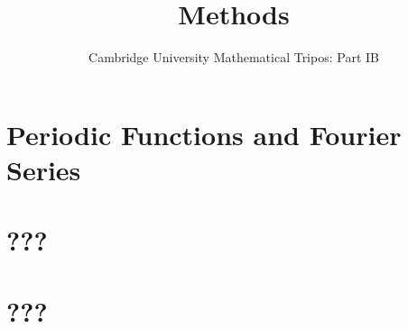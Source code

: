 \documentclass{article}
\title{Methods}
\author{Cambridge University Mathematical Tripos: Part IB}
\begin{document}
\maketitle

\tableofcontentsnewpage{}

\section{Periodic Functions and Fourier Series}

\section{???}

\section{???}

\end{document}
